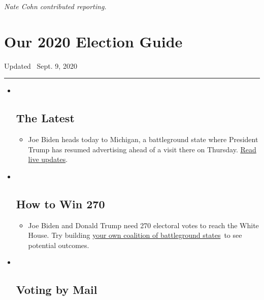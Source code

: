 \emph{Nate Cohn contributed reporting.}

\hypertarget{our-2020-election-guide}{%
\section{Our 2020 Election Guide}\label{our-2020-election-guide}}

Updated ~Sept. 9, 2020

\begin{center}\rule{0.5\linewidth}{\linethickness}\end{center}

\begin{itemize}
\item ~
  \hypertarget{the-latest}{%
  \subsection{The Latest}\label{the-latest}}

  \begin{itemize}
  \item
    Joe Biden heads today to Michigan, a battleground state where
    President Trump has resumed advertising ahead of a visit there on
    Thursday.
    \href{https://www.nytimes3xbfgragh.onion/live/2020/09/09/us/trump-vs-biden?action=click\&pgtype=Article\&state=default\&region=BELOW_MAIN_CONTENT\&context=storylines_guide}{Read
    live updates}.
  \end{itemize}
\item ~
  \hypertarget{how-to-win-270}{%
  \subsection{How to Win 270}\label{how-to-win-270}}

  \begin{itemize}
  \item
    Joe Biden and Donald Trump need 270 electoral votes to reach the
    White House. Try building
    \href{https://www.nytimes3xbfgragh.onion/interactive/2020/us/elections/election-states-biden-trump.html?action=click\&pgtype=Article\&state=default\&region=BELOW_MAIN_CONTENT\&context=storylines_guide}{your
    own coalition of battleground states}~to see potential outcomes.
  \end{itemize}
\item ~
  \hypertarget{voting-by-mail}{%
  \subsection{Voting by Mail}\label{voting-by-mail}}


\end{itemize}
